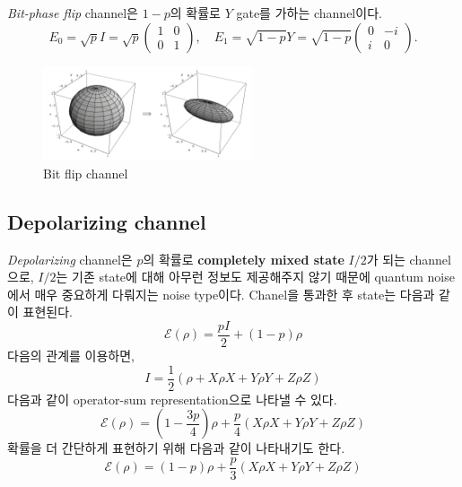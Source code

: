 \textit{Bit-phase flip} channel은 $1-p$의 확률로 $Y$ gate를 가하는 channel이다.
$$
E_0=\sqrt{p} I=\sqrt{p}\left(\begin{array}{ll}
1 & 0 \\
0 & 1
\end{array}\right), \quad E_1=\sqrt{1-p} Y=\sqrt{1-p}\left(\begin{array}{cc}
0 & -i \\
i & 0
\end{array}\right) .
$$

\begin{figure}
    \centering
    \includegraphics[width=0.55\textwidth]{figures/bit_flip.png}
    \caption{Bit flip channel \cite{nielsen2001quantum}}
    \label{fig:bit-flip}
\end{figure}

\subsection{Depolarizing channel}
\textit{Depolarizing} channel은 $p$의 확률로 \textbf{completely mixed state} $I/2$가 되는 channel으로, $I/2$는 기존 state에 대해 아무런 정보도 제공해주지 않기 때문에 quantum noise에서 매우 중요하게 다뤄지는 noise type이다.
Chanel을 통과한 후 state는 다음과 같이 표현된다.
\begin{equation*}
    \mathcal{E}(\rho)=\frac{p I}{2}+(1-p) \rho
\end{equation*}
다음의 관계를 이용하면,
\begin{equation*}
    I=\frac{1}{2}(\rho+X \rho X+Y \rho Y+Z \rho Z)
\end{equation*}
다음과 같이 operator-sum representation으로 나타낼 수 있다. 
\begin{equation*}
    \mathcal{E}(\rho)=\left(1-\frac{3 p}{4}\right) \rho+\frac{p}{4}(X \rho X+Y \rho Y+Z \rho Z) 
\end{equation*}
확률을 더 간단하게 표현하기 위해 다음과 같이 나타내기도 한다.
\begin{equation*}
    \mathcal{E}(\rho)=\left(1-p\right) \rho+\frac{p}{3}(X \rho X+Y \rho Y+Z \rho Z)
\end{equation*}

